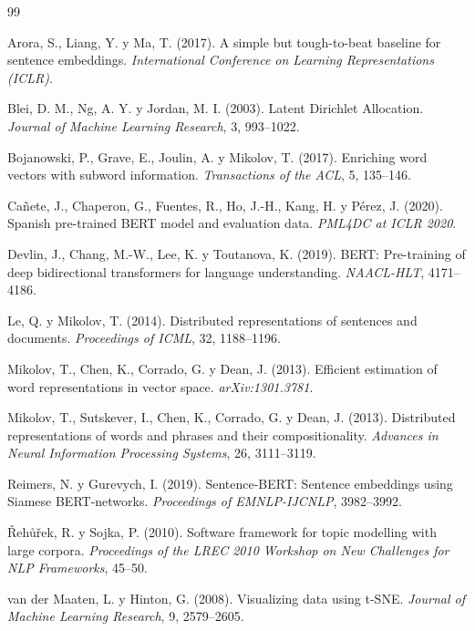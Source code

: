 \documentclass[12pt, a4paper]{article}
\begin{document}
\begin{thebibliography}{99}
\small

Arora, S., Liang, Y. y Ma, T. (2017). A simple but tough-to-beat baseline for sentence embeddings.
\textit{International Conference on Learning Representations (ICLR)}.

Blei, D. M., Ng, A. Y. y Jordan, M. I. (2003). Latent Dirichlet Allocation.
\textit{Journal of Machine Learning Research}, 3, 993--1022.

Bojanowski, P., Grave, E., Joulin, A. y Mikolov, T. (2017). Enriching word vectors with subword
information. \textit{Transactions of the ACL}, 5, 135--146.

Cañete, J., Chaperon, G., Fuentes, R., Ho, J.-H., Kang, H. y Pérez, J. (2020). Spanish pre-trained
BERT model and evaluation data. \textit{PML4DC at ICLR 2020}.

Devlin, J., Chang, M.-W., Lee, K. y Toutanova, K. (2019). BERT: Pre-training of deep bidirectional
transformers for language understanding. \textit{NAACL-HLT}, 4171--4186.

Le, Q. y Mikolov, T. (2014). Distributed representations of sentences and documents.
\textit{Proceedings of ICML}, 32, 1188--1196.

Mikolov, T., Chen, K., Corrado, G. y Dean, J. (2013). Efficient estimation of word representations in
vector space. \textit{arXiv:1301.3781}.

Mikolov, T., Sutskever, I., Chen, K., Corrado, G. y Dean, J. (2013). Distributed representations of
words and phrases and their compositionality. \textit{Advances in Neural Information Processing
Systems}, 26, 3111--3119.

Reimers, N. y Gurevych, I. (2019). Sentence-BERT: Sentence embeddings using Siamese BERT-networks.
\textit{Proceedings of EMNLP-IJCNLP}, 3982--3992.

\v{R}eh\r{u}\v{r}ek, R. y Sojka, P. (2010). Software framework for topic modelling with large corpora.
\textit{Proceedings of the LREC 2010 Workshop on New Challenges for NLP Frameworks}, 45--50.

van der Maaten, L. y Hinton, G. (2008). Visualizing data using t-SNE. \textit{Journal of Machine
Learning Research}, 9, 2579--2605.

\end{thebibliography}
\end{document}

